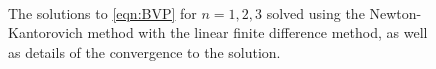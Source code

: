 \documentclass[12pt]{article}
\numberwithin{equation}{section}
\numberwithin{figure}{section}
\numberwithin{table}{section}
\begin{document}
\begin{figure}[h]
    \centering
    \,
    \caption{The solutions to \autoref{eqn:BVP} for $n=1,2,3$ solved using the Newton-Kantorovich method with the linear finite difference method, as well as details of the convergence to the solution.}
    \label{fig:NK FD}
\end{figure}
\end{document}
